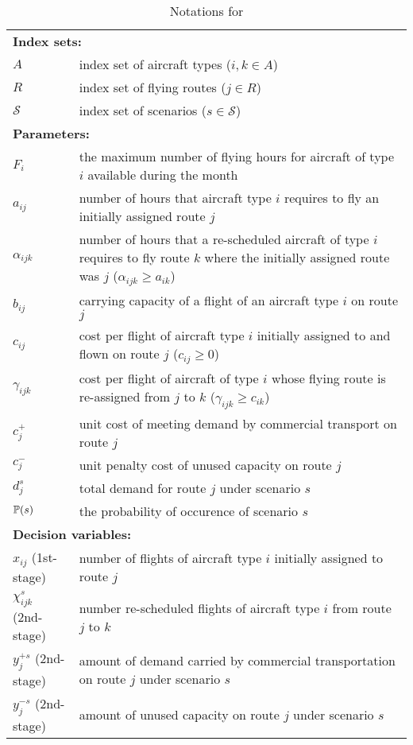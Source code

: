 \begin{table}[H]
	\caption{Notations for \airlift}
	\label{aiflift:notation}
	\resizebox{\textwidth}{!}
	{
		\begin{tabular}{ll}
			\toprule
			\multicolumn{2}{l}{\textbf{Index sets:}} \\
			$A$ & index set of aircraft types ($i,k\in A$)\\ 
			$R$ & index set of flying routes ($j\in R$)\\ 
			$\mathcal{S}$ & index set of scenarios ($s\in \mathcal{S}$) \\ \midrule
			\multicolumn{2}{l}{\textbf{Parameters:}} \\
			$F_i$ & the maximum number of flying hours for aircraft of type $i$ available during the month\\
			$a_{ij}$ & number of hours that aircraft type $i$ requires to fly an initially assigned route $j$  \\
			$\alpha_{ijk}$ & number of hours that a re-scheduled aircraft of type $i$ requires to fly route $k$ where the initially assigned route was $j$ ($\alpha_{ijk}\ge a_{ik}$)\\
			$b_{ij}$ & carrying capacity of a flight of an aircraft type $i$ on route $j$\\
			$c_{ij}$ & cost per flight of aircraft type $i$ initially assigned to and flown on route $j$ ($c_{ij}\ge 0$)\\
			$\gamma_{ijk} $& cost per flight of aircraft of type $i$ whose flying route is re-assigned from $j$ to $k$ ($\gamma_{ijk}\ge c_{ik}$)\\			
			$c_j^+$ & unit cost of meeting demand by commercial transport on route $j$\\
			$c_j^-$ & unit penalty cost of unused capacity on route $j$\\
			$d_j^s$ & total demand for route $j$ under scenario $s$ \\
			$\operatorname*{\mathbb{P}}(s)$ & \textrm{the probability of occurence of scenario $s$} \\ \midrule
			\multicolumn{2}{l}{\textbf{Decision variables:}} \\
			$x_{ij}$ (1st-stage) & number of flights of aircraft type $i$ initially assigned to route $j$ \\
			$\chi_{ijk}^s$ (2nd-stage) & number re-scheduled flights of aircraft type $i$ from route $j$ to $k$ \\ 
			$y_j^{+s}$ (2nd-stage) & amount of demand carried by commercial transportation on route $j$ under scenario $s$\\
			$y_j^{-s}$ (2nd-stage) & amount of unused capacity on route $j$ under scenario $s$\\
			\bottomrule
		\end{tabular}
	}
\end{table} 

